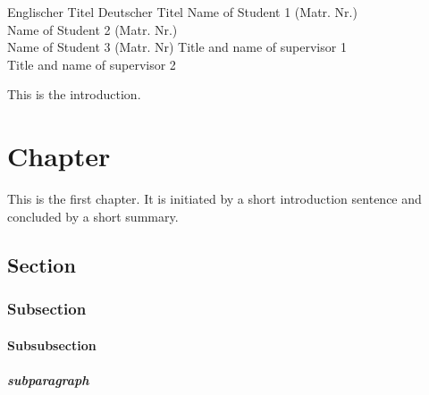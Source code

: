 \documentclass[xlevel, hyperref, nat, mp, en]{wise}
\begin{document}
\doubleseminartitlepage
{Englischer Titel}
{Deutscher Titel}
{Name of Student 1 (Matr. Nr.) \\ Name of Student 2 (Matr. Nr.) \\ Name of Student 3 (Matr. Nr)}
{Title and name of supervisor 1 \\ Title and name of supervisor 2}
\begin{preface}
  \abstract
  

  \tableofcontents
\end{preface}

\introduction

This is the introduction.


\section{Chapter}

This is the first chapter. It is initiated by a short introduction sentence and concluded by a short summary. 




\label{sec:chapter}



\subsection{Section}
\label{sec:section}




\subsubsection{Subsection}
\label{sec:subsection}


\paragraph{Subsubsection}
\label{sec:subsubsection}

\subparagraph{subparagraph}
\label{sec:subparagraph}
\end{document}
